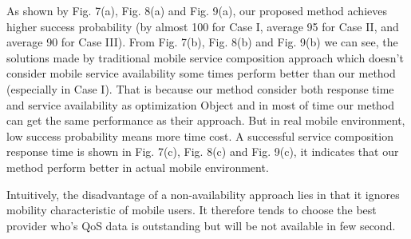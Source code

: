 \documentclass[10pt,journal,compsoc]{IEEEtran}
\begin{document}
As shown by Fig. 7(a), Fig. 8(a) and Fig. 9(a), our proposed method achieves higher success probability (by almost 100%
for Case I, average 95%
for Case II, and average 90%
for Case III). From Fig. 7(b), Fig. 8(b) and Fig. 9(b) we can see, the solutions made by traditional mobile service composition approach which doesn't consider mobile service availability some times perform better than our method (especially in Case I). That is because our method consider both response time and service availability as optimization Object and in most of time our method can get the same performance as their approach. But in real mobile environment, low success probability means more time cost. A successful service composition response time is shown in Fig. 7(c), Fig. 8(c) and Fig. 9(c), it indicates that our method perform better in actual mobile environment.

Intuitively, the disadvantage of a non-availability approach lies in that it ignores mobility characteristic of mobile users. It therefore tends to choose the best provider who's QoS data is outstanding but will be not available in few second.








\end{document}
